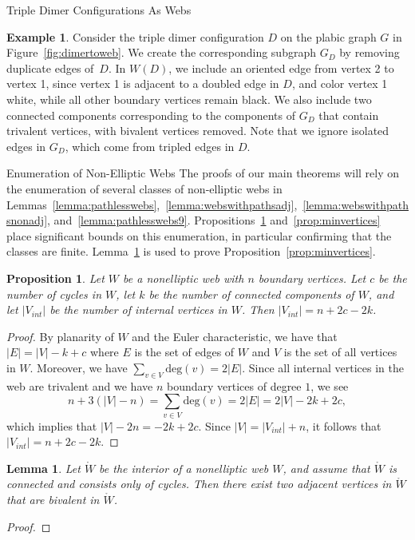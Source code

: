 \documentclass[11pt]{article}
\newtheorem{lemma}[theo]{Lemma}
\newtheorem{prop}[theo]{Proposition}
\theoremstyle{definition}
\newtheorem{exam}[theo]{Example}
\numberwithin{equation}{section}
\numberwithin{equation}{section}
\begin{document}
\begin{subsection}{Triple Dimer Configurations As Webs}
\begin{exam}
Consider the triple dimer configuration $D$ on the plabic graph $G$ in Figure~\ref{fig:dimertoweb}. We create the corresponding subgraph $G_D$ by removing duplicate edges of~$D$. In $W(D)$, we include an oriented edge from vertex 2 to vertex 1, since vertex 1 is adjacent to a doubled edge in $D$, and color vertex 1 white, while all other boundary vertices remain black. We also include two connected components corresponding to the components of $G_D$ that contain trivalent vertices, with bivalent vertices removed. Note that we ignore isolated edges in $G_D$, which come from tripled edges in $D$.
\end{exam}
\end{subsection}

\begin{subsection}{Enumeration of Non-Elliptic Webs}
The proofs of our main theorems will rely on the enumeration of several classes of non-elliptic webs in Lemmas~\ref{lemma:pathlesswebs},~\ref{lemma:webswithpathsadj},~\ref{lemma:webswithpathsnonadj}, and~\ref{lemma:pathlesswebs9}. Propositions~\ref{prop:eulerchar} and~\ref{prop:minvertices} place significant bounds on this enumeration, in particular confirming that the classes are finite. Lemma~\ref{lemma:2deg2verts} is used to prove Proposition~\ref{prop:minvertices}.

\begin{prop}\label{prop:eulerchar}
Let $W$ be a nonelliptic web with $n$ boundary vertices. Let $c$ be the number of cycles in $W$, let $k$ be the number of connected components of $W$, and let $|V_{int}|$ be the number of internal vertices in $W$. Then $|V_{int}| = n+2c-2k$.
\end{prop}

\begin{proof}
By planarity of $W$ and the Euler characteristic, we have that $|E| = |V|-k+c$ where $E$ is the set of edges of $W$ and $V$ is the set of all vertices in $W$. Moreover, we have $\sum_{v \in V} \text{deg}(v) = 2|E|$. Since all internal vertices in the web are trivalent and we have $n$ boundary vertices of degree $1$, we see
\[n + 3(|V|-n) = \sum_{v \in V} \text{deg}(v) = 2|E| = 2|V| - 2k + 2c,\]
which implies that $|V| - 2n = -2k+2c$. Since $|V| = |V_{int}|+n$, it follows that $|V_{int}| = n+2c-2k$. 
\end{proof}

\begin{lemma}\label{lemma:2deg2verts}
Let $\mathring{W}$ be the interior of a nonelliptic web $W$, and assume that $\mathring{W}$ is connected and consists only of cycles. Then there exist two adjacent vertices in $\mathring{W}$ that are bivalent in $\mathring{W}$.
\end{lemma}
\begin{proof}


\end{proof}
\end{subsection}
\end{document}
